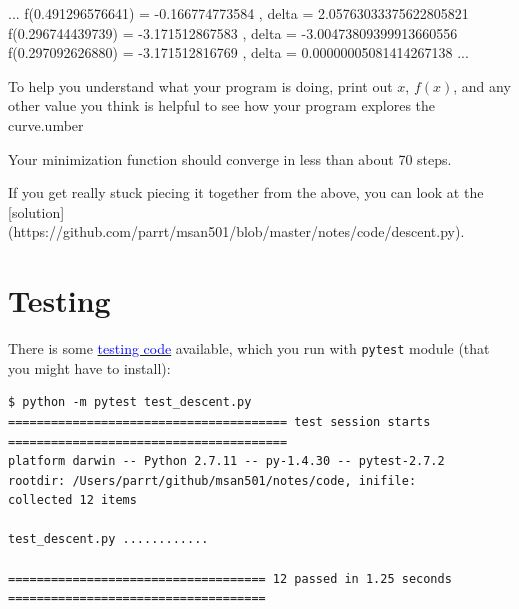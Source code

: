 \documentclass[titlepage]{tufte-book}
\begin{document}
\begin{fullwidth}
\begin{pyverbatim}
...
f(0.491296576641) = -0.166774773584 , delta = 2.05763033375622805821
f(0.296744439739) = -3.171512867583 , delta = -3.00473809399913660556
f(0.297092626880) = -3.171512816769 , delta = 0.00000005081414267138
...
\end{pyverbatim}

To help you understand what your program is doing, print out $x$, $f(x)$, and any other value you think is helpful to see how your program explores the curve.umber

Your minimization function should converge in less than about 70 steps.

If you get really stuck piecing it together from the above, you can look at the [solution](https://github.com/parrt/msan501/blob/master/notes/code/descent.py).

\section{Testing}

There is some \href{https://github.com/parrt/msan501/blob/master/notes/code/test\_descent.py}{\textcolor{blue}{testing code}} available, which you run with {\tt pytest} module (that you might have to install):

\begin{verbatim}
$ python -m pytest test_descent.py 
======================================= test session starts =======================================
platform darwin -- Python 2.7.11 -- py-1.4.30 -- pytest-2.7.2
rootdir: /Users/parrt/github/msan501/notes/code, inifile: 
collected 12 items 

test_descent.py ............

==================================== 12 passed in 1.25 seconds ====================================
\end{verbatim}
 
\end{fullwidth}
\end{document}
